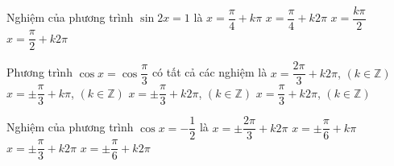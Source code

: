 \begin{ex}%
	 Nghiệm của phương trình $\sin 2x=1$ là
	 \choice
		{\True $x=\dfrac{\pi }{4}+k\pi  $}
		{$x=\dfrac{\pi  }{4}+k2\pi $}
		{$x=\dfrac{k\pi }{2}$} 
		{$x=\dfrac{\pi }{2}+k2\pi $} 
\end{ex}

\begin{ex}%
	Phương  trình $\cos x=\cos\dfrac{\pi}{3}$ có tất cả các nghiệm là
	\choice 
		{$x=\dfrac{2\pi}{3}+k2\pi  $, $\left(k\in\mathbb{Z}\right)$}
		{$x=\pm\dfrac{\pi}{3}+k\pi $,  $\left(k\in\mathbb{Z}\right)$}
		{\True $x=\pm\dfrac{\pi}{3}+k2\pi$,  $\left(k\in\mathbb{Z}\right)$}
		{$x=\dfrac{\pi}{3}+k2\pi $,  $\left(k\in\mathbb{Z}\right)$}
\end{ex}

\begin{ex}%
	Nghiệm của phương  trình $\cos x=- \dfrac{1}{2}$ là
	 \choice
		{\True $x=\pm  \dfrac{2\pi }{3}+k2\pi $}
		 {$x=\pm \dfrac{\pi }{6}+k\pi $}
		{$x=\pm \dfrac{\pi }{3}+k2\pi $} 
		{$x=\pm \dfrac{\pi }{6}+k2\pi  $}
\end{ex}


